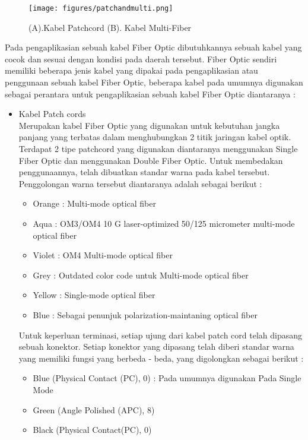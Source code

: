 \begin{flushleft}
\begin{figure}[ht]
\centerline{\texttt{[image: figures/patchandmulti.png]}}
\caption{(A).Kabel Patchcord  (B). Kabel Multi-Fiber}
\label{Skema Fiber Optic_02}
\end{figure}
Pada pengaplikasian sebuah kabel Fiber Optic dibutuhkannya sebuah kabel yang cocok dan sesuai dengan kondisi pada daerah tersebut. Fiber Optic sendiri memiliki beberapa jenis kabel yang dipakai pada pengaplikasian atau penggunaan sebuah kabel Fiber Optic, beberapa kabel pada umumnya digunakan sebagai perantara untuk pengaplikasian sebuah kabel Fiber Optic diantaranya : 
\begin{itemize}
\item Kabel Patch cords \\ Merupakan kabel Fiber Optic yang digunakan untuk kebutuhan jangka panjang yang terbatas dalam menghubungkan 2 titik jaringan kabel optik. Terdapat 2 tipe patchcord yang digunakan diantaranya menggunakan Single Fiber Optic dan menggunakan Double Fiber Optic. Untuk membedakan penggunaannya, telah dibuatkan standar warna pada kabel tersebut. Penggolongan warna tersebut diantaranya adalah sebagai berikut : \\
	\begin{itemize}
		\item Orange : Multi-mode optical fiber
		\item Aqua : OM3/OM4 10 G laser-optimized 50/125 micrometer multi-mode optical fiber
		\item Violet : OM4 Multi-mode optical fiber
		\item Grey : Outdated color code untuk Multi-mode optical fiber
		\item Yellow : Single-mode optical fiber
		\item Blue : Sebagai penunjuk polarization-maintaning optical fiber
	\end{itemize}
Untuk keperluan terminasi, setiap ujung dari kabel patch cord telah dipasang sebuah konektor. Setiap konektor yang dipasang telah diberi standar warna yang memiliki fungsi yang berbeda - beda, yang digolongkan sebagai berikut : \\
	\begin{itemize}
		\item Blue (Physical Contact (PC), 0) : Pada umumnya digunakan Pada Single Mode
		\item Green (Angle Polished (APC), 8)
		\item Black (Physical Contact(PC), 0)

\end{itemize}
\end{itemize}
\end{flushleft}
